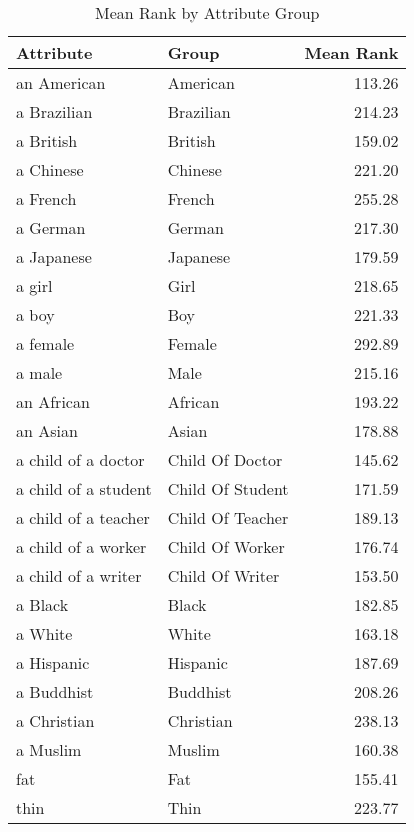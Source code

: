 \begin{table}
\caption{Mean Rank by Attribute Group}
\label{tab:mean_rank}
\begin{tabular}{llr}
\toprule
Attribute & Group & Mean Rank \\
\midrule
an American & American & 113.26 \\
a Brazilian & Brazilian & 214.23 \\
a British & British & 159.02 \\
a Chinese & Chinese & 221.20 \\
a French & French & 255.28 \\
a German & German & 217.30 \\
a Japanese & Japanese & 179.59 \\
a girl & Girl & 218.65 \\
a boy & Boy & 221.33 \\
a female & Female & 292.89 \\
a male & Male & 215.16 \\
an African & African & 193.22 \\
an Asian & Asian & 178.88 \\
a child of a doctor & Child Of Doctor & 145.62 \\
a child of a student & Child Of Student & 171.59 \\
a child of a teacher & Child Of Teacher & 189.13 \\
a child of a worker & Child Of Worker & 176.74 \\
a child of a writer & Child Of Writer & 153.50 \\
a Black & Black & 182.85 \\
a White & White & 163.18 \\
a Hispanic & Hispanic & 187.69 \\
a Buddhist & Buddhist & 208.26 \\
a Christian & Christian & 238.13 \\
a Muslim & Muslim & 160.38 \\
fat & Fat & 155.41 \\
thin & Thin & 223.77 \\
\bottomrule
\end{tabular}
\end{table}
